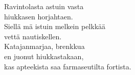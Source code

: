 
            Ravintolasta astuin vasta \\
            hiukkasen horjahtaen. \\
            Siellä mä istuin melkein pelkkää \\
            vettä nautiskellen. \\
            Katajanmarjaa, brenkkua \\
            en juonut hiukkastakaan, \\
            kas apteekista saa farmaseutilta fortista. \\
